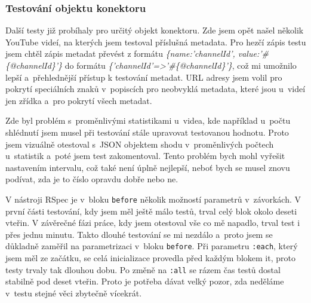 \subsubsection{Testování objektu konektoru}
\par Další testy již probíhaly pro určitý objekt konektoru. Zde jsem opět našel několik YouTube videí, na kterých jsem testoval příslušná metadata. Pro hezčí zápis testu jsem chtěl zápis metadat převést z formátu \textit{\{name:'channelId', value:'\#\{@channelId\}'\}} do formátu \textit{\{'channelId'=>'\#\{@channelId\}'\}}, což mi umožnilo lepší a~přehlednější přístup k testování metadat. URL adresy jsem volil pro pokrytí speciálních znaků v~popiscích pro neobvyklá metadata, které jsou u~videí jen zřídka a~pro pokrytí všech metadat. 
\par Zde byl problém s~proměnlivými statistikami u~videa, kde například u~počtu shlédnutí jsem musel při testování stále upravovat testovanou hodnotu. Proto jsem vizuálně otestoval s~JSON objektem shodu v~proměnlivých počtech u~statistik a~poté jsem test zakomentoval. Tento problém bych mohl vyřešit nastavením intervalu, což také není úplně nejlepší, neboť bych se musel znovu podívat, zda je to číslo opravdu dobře nebo ne.
\par V nástroji RSpec je v~bloku \texttt{before} několik možností parametrů v~závorkách. V první části testování, kdy jsem měl ještě málo testů, trval celý blok okolo deseti vteřin. V závěrečné fázi práce, kdy jsem otestoval vše co mě napadlo, trval test i přes jednu minutu. Takto dlouhé testování se mi nezdálo a~proto jsem se důkladně zaměřil na parametrizaci v~bloku \texttt{before}. Při parametru \texttt{:each}, který jsem měl ze začátku, se celá inicializace provedla před každým blokem it, proto testy trvaly tak dlouhou dobu. Po změně na \texttt{:all} se rázem čas testů dostal stabilně pod deset vteřin. Proto je potřeba dávat velký pozor, zda neděláme v~testu stejné věci zbytečně vícekrát.

